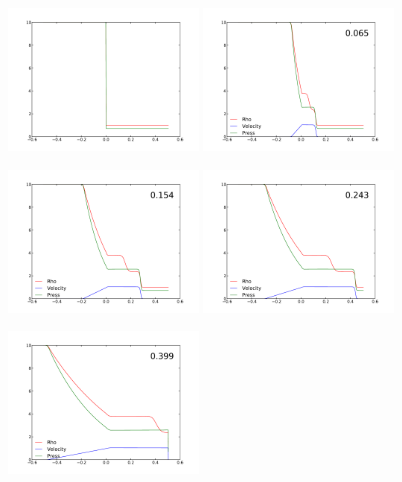 \documentclass[11pt,letterpaper]{article}
\begin{document}
\begin{figure}[h!]
	\centering
	\includegraphics[width=0.45\textwidth]{plot1}
	\includegraphics[width=0.45\textwidth]{plot2}
\end{figure}
\begin{figure}[h!]
	\centering
	\includegraphics[width=0.45\textwidth]{plot3}
	\includegraphics[width=0.45\textwidth]{plot4}
\end{figure}
\begin{figure}[h!]
	\centering
	\includegraphics[width=0.45\textwidth]{plot5}
\end{figure}	
\end{document}
